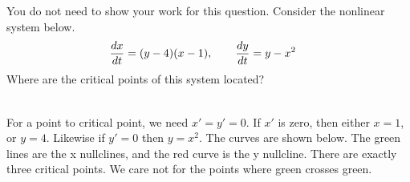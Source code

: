 \ifnum {}
\question[1] You do not need to show your work for this question. Consider the nonlinear system below.
\begin{align*}
    {\frac{dx}{dt}} &= (y-4)(x-1) , \qquad {\frac{dy}{dt}} = y-x^2
\end{align*}
Where are the critical points of this system located? %
\ifnum {} {\color{DarkBlue} \\[12pt] 
For a point to critical point, we need $x' = y' = 0$. If $x'$ is zero, then either $x=1$, or $y=4$. Likewise if $y'=0$ then $y=x^2$. The curves are shown below. The green lines are the x nullclines, and the red curve is the y nullcline. There are exactly three critical points. We care not for the points where green crosses green. 
    \begin{center}
    \end{center}         
} 
\else 
\vspace{3cm}
\fi    
\fi 




